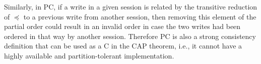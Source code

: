 \documentclass[journal, compsoc]{IEEEtran}
\begin{document}
	Similarly, in PC, if a write in a given session is related by the transitive reduction of $\preccurlyeq$  to a previous write from another session, then removing this element of the partial order could result in an invalid order in case the two writes had been ordered in that way by another session. Therefore PC is also a strong consistency definition that can be used as a C in the CAP theorem, i.e., it cannot have a highly available and partition-tolerant implementation.
	
	
	
	
\end{document}
